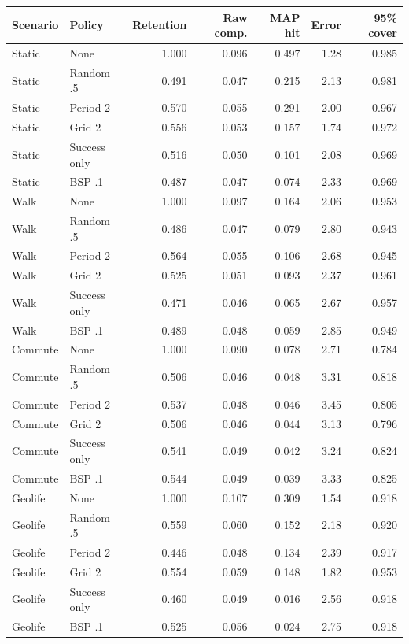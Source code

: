 \begin{tabular}{llrrrrr}
\toprule
Scenario & Policy & Retention & Raw comp. & MAP hit & Error & 95\% cover \\
\midrule
Static & None & 1.000 & 0.096 & 0.497 & 1.28 & 0.985 \\
Static & Random .5 & 0.491 & 0.047 & 0.215 & 2.13 & 0.981 \\
Static & Period 2 & 0.570 & 0.055 & 0.291 & 2.00 & 0.967 \\
Static & Grid 2 & 0.556 & 0.053 & 0.157 & 1.74 & 0.972 \\
Static & Success only & 0.516 & 0.050 & 0.101 & 2.08 & 0.969 \\
Static & BSP .1 & 0.487 & 0.047 & 0.074 & 2.33 & 0.969 \\
\addlinespace
Walk & None & 1.000 & 0.097 & 0.164 & 2.06 & 0.953 \\
Walk & Random .5 & 0.486 & 0.047 & 0.079 & 2.80 & 0.943 \\
Walk & Period 2 & 0.564 & 0.055 & 0.106 & 2.68 & 0.945 \\
Walk & Grid 2 & 0.525 & 0.051 & 0.093 & 2.37 & 0.961 \\
Walk & Success only & 0.471 & 0.046 & 0.065 & 2.67 & 0.957 \\
Walk & BSP .1 & 0.489 & 0.048 & 0.059 & 2.85 & 0.949 \\
\addlinespace
Commute & None & 1.000 & 0.090 & 0.078 & 2.71 & 0.784 \\
Commute & Random .5 & 0.506 & 0.046 & 0.048 & 3.31 & 0.818 \\
Commute & Period 2 & 0.537 & 0.048 & 0.046 & 3.45 & 0.805 \\
Commute & Grid 2 & 0.506 & 0.046 & 0.044 & 3.13 & 0.796 \\
Commute & Success only & 0.541 & 0.049 & 0.042 & 3.24 & 0.824 \\
Commute & BSP .1 & 0.544 & 0.049 & 0.039 & 3.33 & 0.825 \\
\addlinespace
Geolife & None & 1.000 & 0.107 & 0.309 & 1.54 & 0.918 \\
Geolife & Random .5 & 0.559 & 0.060 & 0.152 & 2.18 & 0.920 \\
Geolife & Period 2 & 0.446 & 0.048 & 0.134 & 2.39 & 0.917 \\
Geolife & Grid 2 & 0.554 & 0.059 & 0.148 & 1.82 & 0.953 \\
Geolife & Success only & 0.460 & 0.049 & 0.016 & 2.56 & 0.918 \\
Geolife & BSP .1 & 0.525 & 0.056 & 0.024 & 2.75 & 0.918 \\
\bottomrule
\end{tabular}
